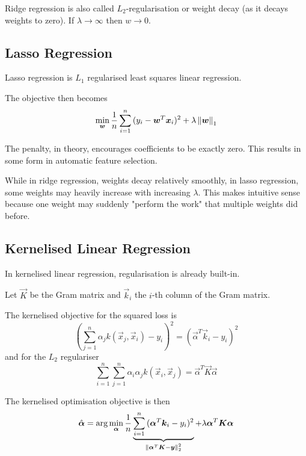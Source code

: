 Ridge regression is also called $L_2$-regularisation
or weight decay (as it decays weights to zero).
If $\lambda \to \infty$ then $w \to 0$.


\subsection{Lasso Regression}
Lasso regression is $L_1$ regularised
least squares linear regression.

The objective then becomes
\begin{equation*}
    \min_{\boldsymbol{w}}{\frac{1}{n}
        \sum_{i=1}^n{(y_i - \boldsymbol{w}^T \boldsymbol{x}_i)^2
            + \lambda \left\lVert\boldsymbol{w}\right\rVert_1
    }}
\end{equation*}

The penalty, in theory, encourages coefficients to be
exactly zero.
This results in some form in automatic feature selection.

While in ridge regression, weights decay relatively smoothly,
in lasso regression, some weights may heavily increase
with increasing $\lambda$.
This makes intuitive sense because one weight may suddenly
"perform the work" that multiple weights did before.


\subsection{Kernelised Linear Regression}
In kernelised linear regression,
regularisation is already built-in.

Let $\vec{K}$ be the Gram matrix and $\vec{k}_i$ the
$i$-th column of the Gram matrix.

The kernelised objective for the squared loss is
\begin{equation*}
    \left(\sum_{j=1}^n{\alpha_j k(\vec{x}_j, \vec{x}_i)} - y_i\right)^2
    = (\vec{\alpha}^T \vec{k}_i - y_i)^2
\end{equation*}
and for the $L_2$ regulariser
\begin{equation*}
    \sum_{i=1}^n{\sum_{j=1}^n{
        \alpha_i \alpha_j k(\vec{x}_i, \vec{x}_j)
    }}
    = \vec{\alpha}^T \vec{K} \vec{\alpha}
\end{equation*}

The kernelised optimisation objective is then
\begin{equation*}
    \hat{\boldsymbol{\alpha}} = \arg\min_{\boldsymbol{\alpha}}{
        \frac{1}{n}
        \underbrace{
        \sum_{i=1}^n{
            (\boldsymbol{\alpha}^T \boldsymbol{k}_i - y_i)^2
        }
        }_{\left\lVert\boldsymbol{\alpha}^T \boldsymbol{K} - \boldsymbol{y}\right\rVert_2^2}
        + \lambda \boldsymbol{\alpha}^T \boldsymbol{K} \boldsymbol{\alpha}
    }
\end{equation*}

